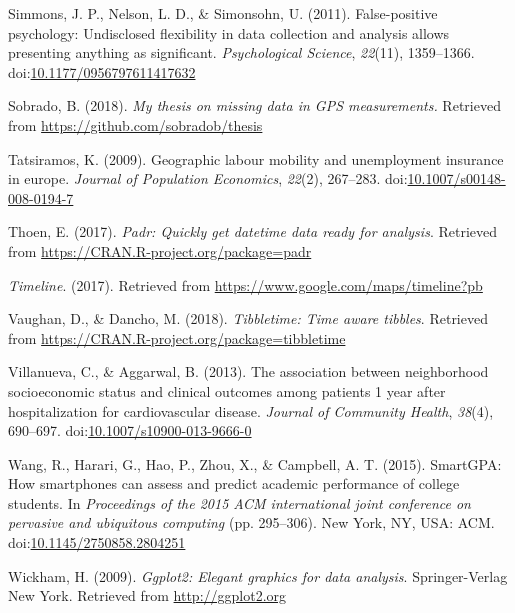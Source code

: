 \documentclass[man]{apa6}
\theoremstyle{definition}
\theoremstyle{definition}
\theoremstyle{definition}
\theoremstyle{remark}
\begin{document}
\hypertarget{ref-simmons_false-positive_2011}{}
Simmons, J. P., Nelson, L. D., \& Simonsohn, U. (2011). False-positive
psychology: Undisclosed flexibility in data collection and analysis
allows presenting anything as significant. \emph{Psychological Science},
\emph{22}(11), 1359--1366.
doi:\href{https://doi.org/10.1177/0956797611417632}{10.1177/0956797611417632}

\hypertarget{ref-sobrado_my_2018}{}
Sobrado, B. (2018). \emph{My thesis on missing data in GPS
measurements.} Retrieved from \url{https://github.com/sobradob/thesis}

\hypertarget{ref-tatsiramos_geographic_2009}{}
Tatsiramos, K. (2009). Geographic labour mobility and unemployment
insurance in europe. \emph{Journal of Population Economics},
\emph{22}(2), 267--283.
doi:\href{https://doi.org/10.1007/s00148-008-0194-7}{10.1007/s00148-008-0194-7}

\hypertarget{ref-R-padr}{}
Thoen, E. (2017). \emph{Padr: Quickly get datetime data ready for
analysis}. Retrieved from \url{https://CRAN.R-project.org/package=padr}

\hypertarget{ref-location_history_timeline_2017}{}
\emph{Timeline}. (2017). Retrieved from
\url{https://www.google.com/maps/timeline?pb}

\hypertarget{ref-R-tibbletime}{}
Vaughan, D., \& Dancho, M. (2018). \emph{Tibbletime: Time aware
tibbles}. Retrieved from
\url{https://CRAN.R-project.org/package=tibbletime}

\hypertarget{ref-villanueva_association_2013}{}
Villanueva, C., \& Aggarwal, B. (2013). The association between
neighborhood socioeconomic status and clinical outcomes among patients 1
year after hospitalization for cardiovascular disease. \emph{Journal of
Community Health}, \emph{38}(4), 690--697.
doi:\href{https://doi.org/10.1007/s10900-013-9666-0}{10.1007/s10900-013-9666-0}

\hypertarget{ref-wang_smartgpa:_2015}{}
Wang, R., Harari, G., Hao, P., Zhou, X., \& Campbell, A. T. (2015).
SmartGPA: How smartphones can assess and predict academic performance of
college students. In \emph{Proceedings of the 2015 ACM international
joint conference on pervasive and ubiquitous computing} (pp. 295--306).
New York, NY, USA: ACM.
doi:\href{https://doi.org/10.1145/2750858.2804251}{10.1145/2750858.2804251}

\hypertarget{ref-R-ggplot2}{}
Wickham, H. (2009). \emph{Ggplot2: Elegant graphics for data analysis}.
Springer-Verlag New York. Retrieved from \url{http://ggplot2.org}
\end{document}
